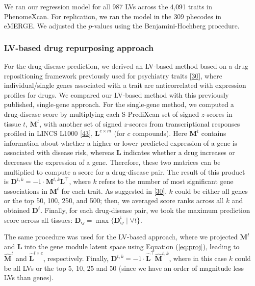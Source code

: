 \documentclass[
  legalpaperpaper,
]{article}
\begin{document}
We ran our regression model for all 987 LVs across the 4,091 traits in PhenomeXcan.
For replication, we ran the model in the 309 phecodes in eMERGE.
We adjusted the \(p\)-values using the Benjamini-Hochberg procedure.

\hypertarget{sec:methods:drug}{%
\subsubsection{LV-based drug repurposing approach}\label{sec:methods:drug}}

For the drug-disease prediction, we derived an LV-based method based on a drug repositioning framework previously used for psychiatry traits {[}\protect\hyperlink{ref-17oeJ0CXy}{30}{]}, where individual/single genes associated with a trait are anticorrelated with expression profiles for drugs.
We compared our LV-based method with this previously published, single-gene approach.
For the single-gene method, we computed a drug-disease score by multiplying each S-PrediXcan set of signed \(z\)-scores in tissue \(t\), \(\mathbf{M}^t\), with another set of signed \(z\)-scores from transcriptional responses profiled in LINCS L1000 {[}\protect\hyperlink{ref-F7lIlh2N}{43}{]}, \(\mathbf{L}^{c \times m}\) (for \(c\) compounds).
Here \(\mathbf{M}^t\) contains information about whether a higher or lower predicted expression of a gene is associated with disease risk, whereas \(\mathbf{L}\) indicates whether a drug increases or decreases the expression of a gene.
Therefore, these two matrices can be multiplied to compute a score for a drug-disease pair.
The result of this product is \(\mathbf{D}^{t,k}=-1 \cdot \mathbf{M}^{t,k} \mathbf{L}^\top\), where \(k\) refers to the number of most significant gene associations in \(\mathbf{M}^t\) for each trait.
As suggested in {[}\protect\hyperlink{ref-17oeJ0CXy}{30}{]}, \(k\) could be either all genes or the top 50, 100, 250, and 500; then, we averaged score ranks across all \(k\) and obtained \(\mathbf{D}^t\).
Finally, for each drug-disease pair, we took the maximum prediction score across all tissues: \(\mathbf{D}_{ij} = \max \{ \mathbf{D}_{ij}^t \mid \forall t \}\).

The same procedure was used for the LV-based approach, where we projected \(\mathbf{M}^{t}\) and \(\mathbf{L}\) into the gene module latent space using Equation (\ref{eq:proj}), leading to \(\hat{\mathbf{M}}^t\) and \(\hat{\mathbf{L}}^{l \times c}\), respectively.
Finally, \(\mathbf{D}^{t,k}=-1 \cdot \hat{\mathbf{L}}^{\top} \hat{\mathbf{M}}^{t,k}\), where in this case \(k\) could be all LVs or the top 5, 10, 25 and 50 (since we have an order of magnitude less LVs than genes).
\end{document}
